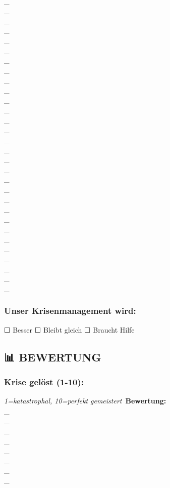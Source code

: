 \\_\\\_\\\_\\\_\\\_\\\_\\\_\\\_\\\_\\\_\\\_\\\_\\\_\\\_\\\_\\\_\\\_\\\_\\\_\\\_\\\_\\\_\\\_\\\_\\\_\\\_\\\_\\\_\\\_\\\_

\subsubsection{\textbf{Unser Krisenmanagement wird:}}

☐ Besser ☐ Bleibt gleich ☐ Braucht Hilfe

\subsection{\textbf{📊 BEWERTUNG}}

\subsubsection{\textbf{Krise gelöst (1-10):}}

\textit{\textcolor{ctmmYellow}{\faLightbulb} 1=katastrophal, 10=perfekt gemeistert}\
\textbf{Bewertung:} \\\_\\\_\\\_\\\_\\\_\\\_\\\_\\\_

